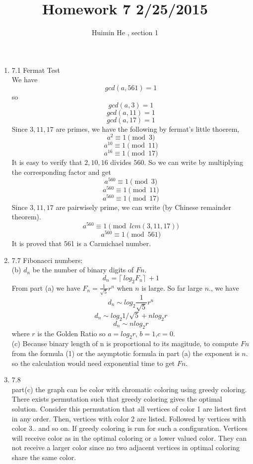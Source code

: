 \documentclass[11pt]{article}
\title{Homework 7 2/25/2015}
\author{Huimin He , section 1}
\begin{document}
\maketitle

\def\bfor{\textbf{for}}
\def\bdo{\textbf{do}}
\def\bwhile{\textbf{while}}
\def\bend{\textbf{end}}
\def\bif{\textbf{if}}
\def\bthen{\textbf{then}}
\def\belse{\textbf{else}}
\def\breturn{\textbf{return}}
\def\bexit{\textbf{exit}}
\def\bprint{\textbf{print}}


\begin{enumerate}
\item 7.1 Fermat Test\\
We have\[gcd(a,561) = 1\]
so \[gcd(a,3)=1\]
\[gcd(a,11) =1\]
\[gcd(a,17) =1\]
Since $3,11,17$ are primes, we have the following by fermat's little thoerem,
\[a^2 \equiv 1 \pmod{3}\]
\[a^{10} \equiv 1 \pmod{11}\]
\[a^{16} \equiv 1 \pmod{17}\]
It is easy to verify that $2,10,16$ divides $560$. So we can write by multiplying the corresponding factor and get
\[a^{560} \equiv 1 \pmod{3}\]
\[a^{560} \equiv 1 \pmod{11}\]
\[a^{560} \equiv 1 \pmod{17}\]
Since $3,11,17$ are pairwisely prime, we can write (by Chinese remainder theorem).
\[a^{560} \equiv 1 \pmod{lcm(3,11,17)}\]
\[a^{560} \equiv 1 \pmod{561}\]
It is proved that 561 is a Carmichael number.


\item 7.7 Fibonacci numbers:\\
(b) $d_n$ be the number of binary digits of $Fn$.
\[ d_n = \lceil\ log_2{F_n}\rceil\ + 1  \]
From part (a) we have $F_n = \frac{1}{\sqrt{5}}r^n $ when $n$ is large.
So far large $n$., we have \[d_n \sim log_2{\frac{1}{\sqrt{5}}}r^n\]
\[d_n \sim log_2{1/\sqrt{5}+nlog_2{r}}\]
\[d_n \sim nlog_2{r}\] where $r$ is the Golden Ratio
so $a = log_2{r}$, $b=1$,$c=0$.\\

(c)
Because binary length of n is proportional to its magitude, to compute $Fn$ from the formula (1) or the asymptotic formula in part (a) the exponent is $n$. so the calculation would need exponential time to get $Fn$.

\item 7.8\\

part(c) the graph can be color with chromatic coloring using greedy coloring. There exists permutation such that greedy coloring gives the optimal solution. Consider this permutation that all vertices of color 1 are listest first in any order. Then, vertices with color 2 are listed. Followed by vertices with color 3.. and so on. If greedy coloring is run for such a configuration. Vertices will receive color as in the optimal coloring or a lower valued color. They can not receive a larger color since no two adjacent vertices in optimal coloring share the same color. \\


\end{enumerate}
\end{document}
